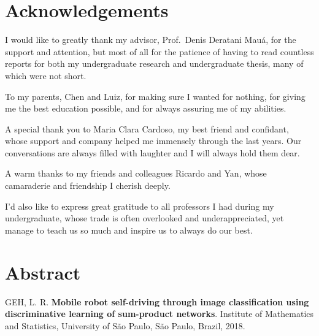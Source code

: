 \chapter*{Acknowledgements}

I would like to greatly thank my advisor, Prof.\ Denis Deratani Mauá, for the support and
attention, but most of all for the patience of having to read countless reports for both my
undergraduate research and undergraduate thesis, many of which were not short.

To my parents, Chen and Luiz, for making sure I wanted for nothing, for giving me the best
education possible, and for always assuring me of my abilities.

A special thank you to Maria Clara Cardoso, my best friend and confidant, whose support and company
helped me immensely through the last years. Our conversations are always filled with laughter and I
will always hold them dear.

A warm thanks to my friends and colleagues Ricardo and Yan, whose camaraderie and friendship I
cherish deeply.

I'd also like to express great gratitude to all professors I had during my undergraduate, whose
trade is often overlooked and underappreciated, yet manage to teach us so much and inspire us to
always do our best.

\vfill
{}

\chapter*{Abstract}

\noindent GEH, L. R. \textbf{Mobile robot self-driving through image classification using
  discriminative learning of sum-product networks}. Institute of Mathematics and Statistics,
University of São Paulo, São Paulo, Brazil, 2018.\\

